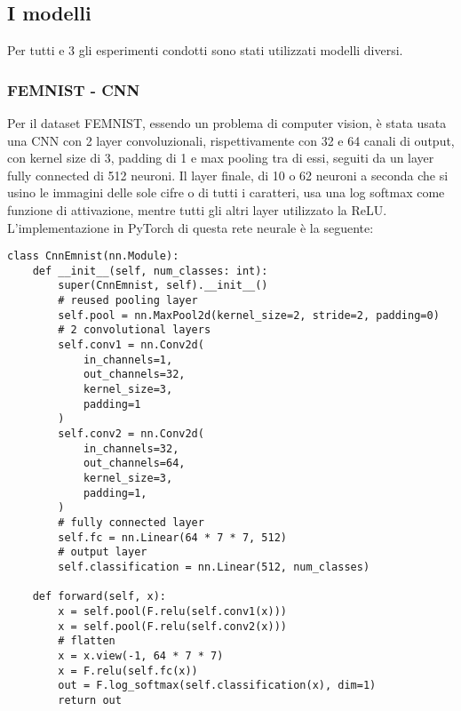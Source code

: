 \subsection{I modelli}
Per tutti e 3 gli esperimenti condotti sono stati utilizzati modelli 
diversi.

\subsubsection{FEMNIST - CNN}
Per il dataset FEMNIST, essendo un problema di computer vision, è stata 
usata una CNN con 2 layer convoluzionali, rispettivamente con 32 e 
64 canali di output, con kernel size di 3, padding di 1
e max pooling tra di essi, seguiti da un layer fully connected 
di 512 neuroni. Il layer finale, di 10 o 62 neuroni a seconda che si 
usino le immagini delle sole cifre o di tutti i caratteri, usa una 
log softmax come funzione di attivazione, mentre tutti gli altri layer 
utilizzato la ReLU. L'implementazione in PyTorch di questa rete neurale
è la seguente:

\begin{lstlisting}
class CnnEmnist(nn.Module):
    def __init__(self, num_classes: int):
        super(CnnEmnist, self).__init__()
        # reused pooling layer
        self.pool = nn.MaxPool2d(kernel_size=2, stride=2, padding=0)
        # 2 convolutional layers
        self.conv1 = nn.Conv2d(
            in_channels=1,
            out_channels=32,
            kernel_size=3,
            padding=1
        )
        self.conv2 = nn.Conv2d(
            in_channels=32,
            out_channels=64,
            kernel_size=3,
            padding=1,
        )
        # fully connected layer
        self.fc = nn.Linear(64 * 7 * 7, 512)
        # output layer
        self.classification = nn.Linear(512, num_classes)

    def forward(self, x):
        x = self.pool(F.relu(self.conv1(x)))
        x = self.pool(F.relu(self.conv2(x)))
        # flatten
        x = x.view(-1, 64 * 7 * 7)
        x = F.relu(self.fc(x))
        out = F.log_softmax(self.classification(x), dim=1)
        return out
\end{lstlisting}


